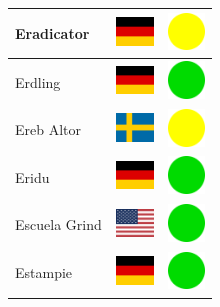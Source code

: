 \documentclass[12pt, a4paper, twoside]{report}
\begin{document}
\begin{center}
\begin{longtable}{|p{5cm}|p{2cm}|p{2cm}|}
Eradicator & \includegraphics[width=1cm]{4x3/de} & \includegraphics[width=1cm]{likes/m} \\ \hline
Erdling & \includegraphics[width=1cm]{4x3/de} & \includegraphics[width=1cm]{likes/y} \\ \hline
Ereb Altor & \includegraphics[width=1cm]{4x3/se} & \includegraphics[width=1cm]{likes/m} \\ \hline
Eridu & \includegraphics[width=1cm]{4x3/de} & \includegraphics[width=1cm]{likes/y} \\ \hline
Escuela Grind & \includegraphics[width=1cm]{4x3/us} & \includegraphics[width=1cm]{likes/y} \\ \hline
Estampie & \includegraphics[width=1cm]{4x3/de} & \includegraphics[width=1cm]{likes/y} \\ \hline

\end{longtable}
\end{center}
\end{document}
